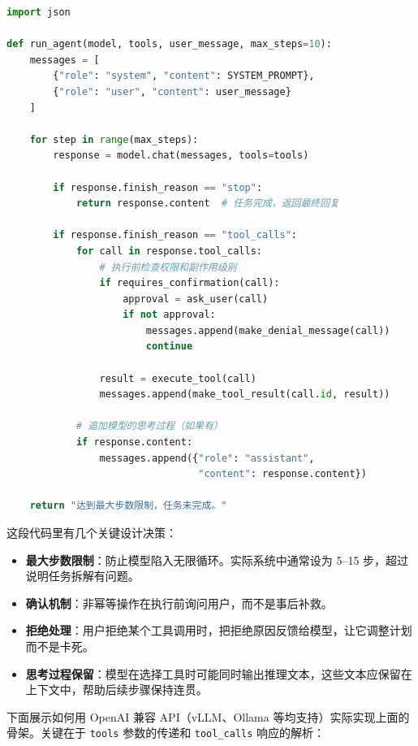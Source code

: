 \begin{lstlisting}[language=Python]
import json

def run_agent(model, tools, user_message, max_steps=10):
    messages = [
        {"role": "system", "content": SYSTEM_PROMPT},
        {"role": "user", "content": user_message}
    ]

    for step in range(max_steps):
        response = model.chat(messages, tools=tools)

        if response.finish_reason == "stop":
            return response.content  # 任务完成，返回最终回复

        if response.finish_reason == "tool_calls":
            for call in response.tool_calls:
                # 执行前检查权限和副作用级别
                if requires_confirmation(call):
                    approval = ask_user(call)
                    if not approval:
                        messages.append(make_denial_message(call))
                        continue

                result = execute_tool(call)
                messages.append(make_tool_result(call.id, result))

            # 追加模型的思考过程（如果有）
            if response.content:
                messages.append({"role": "assistant",
                                 "content": response.content})

    return "达到最大步数限制，任务未完成。"
\end{lstlisting}

这段代码里有几个关键设计决策：

\begin{itemize}
  \item \textbf{最大步数限制}：防止模型陷入无限循环。实际系统中通常设为 5--15 步，超过说明任务拆解有问题。
  \item \textbf{确认机制}：非幂等操作在执行前询问用户，而不是事后补救。
  \item \textbf{拒绝处理}：用户拒绝某个工具调用时，把拒绝原因反馈给模型，让它调整计划而不是卡死。
  \item \textbf{思考过程保留}：模型在选择工具时可能同时输出推理文本，这些文本应保留在上下文中，帮助后续步骤保持连贯。
\end{itemize}

下面展示如何用 OpenAI 兼容 API（vLLM、Ollama 等均支持）实际实现上面的骨架。关键在于 \texttt{tools} 参数的传递和 \texttt{tool\_calls} 响应的解析：

